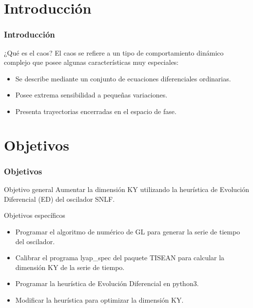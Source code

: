 \documentclass[10pt]{beamer}
\begin{document}
	\section{Introducción}
	\begin{frame}
	\frametitle{Introducción}
		\begin{block}{¿Qué es el caos?}
		\justifying
			El caos se refiere a un tipo de comportamiento dinámico complejo que posee algunas características muy especiales:
			\begin{itemize}
				\item Se describe mediante un conjunto de ecuaciones diferenciales ordinarias.
				\item Posee extrema sensibilidad a pequeñas variaciones.
				\item Presenta trayectorias encerradas en el espacio de fase.
			\end{itemize}
		\end{block}
	\end{frame}

	\section{Objetivos}
	\begin{frame}
		\frametitle{Objetivos}
		\begin{block}{Objetivo general}
		\justifying
			Aumentar la dimensión KY utilizando la heurística de Evolución Diferencial (ED) del oscilador SNLF.
		\end{block}
		
		\begin{block}{Objetivos específicos}
			\begin{itemize}
			\justifying
				\item Programar el algoritmo de numérico de GL para generar la serie de tiempo del oscilador.
				\item Calibrar el programa lyap\_{}spec del paquete TISEAN para calcular la dimensión KY de la serie de tiempo.
				\item Programar la heurística de Evolución Diferencial en python3.
				\item Modificar la heurística para optimizar la dimensión KY.
			\end{itemize}
		\end{block}
	\end{frame}
\end{document}
